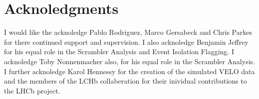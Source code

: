 \section{Acknoledgments}
	I would like the acknoledge Pablo Rodriguez, Marco Gersabeck and Chris Parkes for there continued support and supervision.
	I also acknoledge Benjamin Jeffrey for his equal role in the Scrambler Analysis and Event Isolation Flagging.
	I acknoledge Toby Nonnenmacher also, for his equal role in the Scrambler Analysis.
	I further acknoledge Karol Hennessy for the creation of the simulated VELO data and the members of the LCHb collaberation for their inividual contributions to the LHCb project.